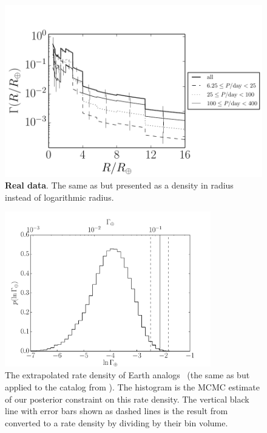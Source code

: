 \begin{figure}[p]
\begin{center}
\includegraphics{figures/exopop/results/linear-radius.pdf}
\end{center}
\caption[The radius distribution of exoplanets plotted in terms of linear
radius]{%
{\bf Real data}.
The same as  but presented as a density in radius instead of
logarithmic radius.
}
\end{figure}

\begin{figure}[p]
\begin{center}
\includegraphics[width=0.8\textwidth]{figures/exopop/results/rate.pdf}
\end{center}
\caption[The rate of Earth analogs]{%
The extrapolated rate density of Earth analogs \gammaearth\ (the same as
 but applied to the catalog from \citealt{Petigura:2013}).
The histogram is the MCMC estimate of our posterior constraint on this rate
density.
The vertical black line with error bars shown as dashed lines is the result
from \citet{Petigura:2013} converted to a rate density by dividing by their bin
volume.
}
\end{figure}

